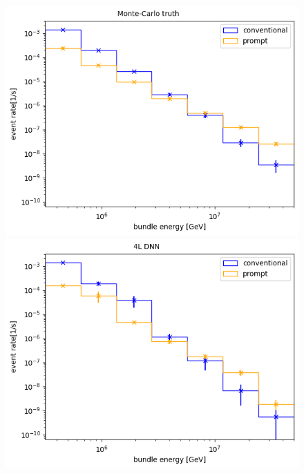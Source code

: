 \documentclass[
  tucolor,       %
  BCOR=12mm,     %
  parskip=half,  %
  open=any,      %
  cleardoublepage=plain,  %
]{tudothesis}
\begin{document}
\begin{figure}
  \centering
  \begin{minipage}[t]{0.49\textwidth}
    \includegraphics[width=\textwidth]{Plots/muon flux monte carlo bundle}
  \end{minipage}
  \begin{minipage}[t]{0.49\textwidth}
    \includegraphics[width=\textwidth]{Plots/muon flux small dnn bundle}
  \end{minipage}
  \begin{minipage}[t]{0.49\textwidth}

\end{minipage}
\end{figure}
\end{document}
